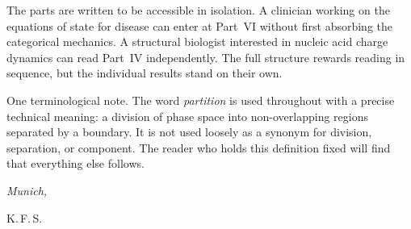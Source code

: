 The parts are written to be accessible in isolation. A clinician working on the
equations of state for disease can enter at Part~VI without first absorbing the
categorical mechanics. A structural biologist interested in nucleic acid charge
dynamics can read Part~IV independently. The full structure rewards reading in
sequence, but the individual results stand on their own.

One terminological note. The word \textit{partition} is used throughout with a
precise technical meaning: a division of phase space into non-overlapping
regions separated by a boundary. It is not used loosely as a synonym for
division, separation, or component. The reader who holds this definition fixed
will find that everything else follows.

\bigskip
\noindent
\textit{Munich, \the\year}

\vspace{0.3cm}
\noindent
K.\,F.\,S.
